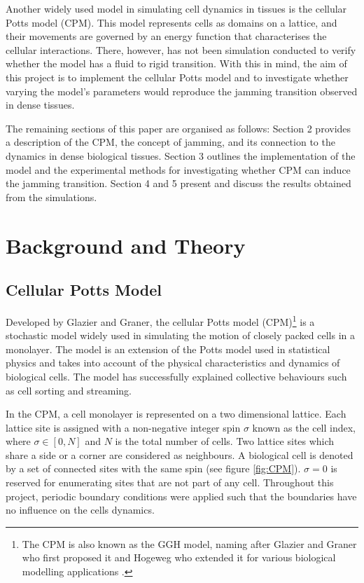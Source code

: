 \documentclass[a4paper,12pt]{article}
\begin{document}
Another widely used model in simulating cell dynamics in tissues is the cellular Potts model (CPM). This model represents cells as domains on a lattice, and their movements are governed by an energy function that characterises the cellular interactions. There, however, has not been simulation conducted to verify whether the model has a fluid to rigid transition. With this in mind, the aim of this project is to implement the cellular Potts model and to investigate whether varying the model's parameters would reproduce the jamming transition observed in dense tissues. 

The remaining sections of this paper are organised as follows: Section 2 provides a description of the CPM, the concept of jamming, and its connection to the dynamics in dense biological tissues. Section 3 outlines the implementation of the model and the experimental methods for investigating whether CPM can induce the jamming transition. Section 4 and 5 present and discuss the results obtained from the simulations. 

\section{Background and Theory}
\subsection{Cellular Potts Model}
\label{sec:CPM}
Developed by Glazier and Graner\cite{graner1992}, the cellular Potts model (CPM)\footnote{The CPM is also known as the GGH model, naming after Glazier and Graner who first proposed it and Hogeweg who extended it for various biological modelling applications \cite{singlecell}.} is a stochastic model widely used in simulating the motion of closely packed cells in a monolayer. The model is an extension of the Potts model used in statistical physics and takes into account of the physical characteristics and dynamics of biological cells. The model has successfully explained collective behaviours such as cell sorting \cite{graner1992} and streaming\cite{szabo2010}.

In the CPM, a cell monolayer is represented on a two dimensional lattice. Each lattice site is assigned with a non-negative integer spin $\sigma$ known as the cell index, where $\sigma \in [0,N]$ and $N$ is the total number of cells. Two lattice sites which share a side or a corner are considered as neighbours. A biological cell is denoted by a set of connected sites with the same spin (see figure \ref{fig:CPM}). $\sigma = 0$ is reserved for enumerating sites that are not part of any cell. Throughout this project, periodic boundary conditions were applied such that the boundaries have no influence on the cells dynamics.
\end{document}
